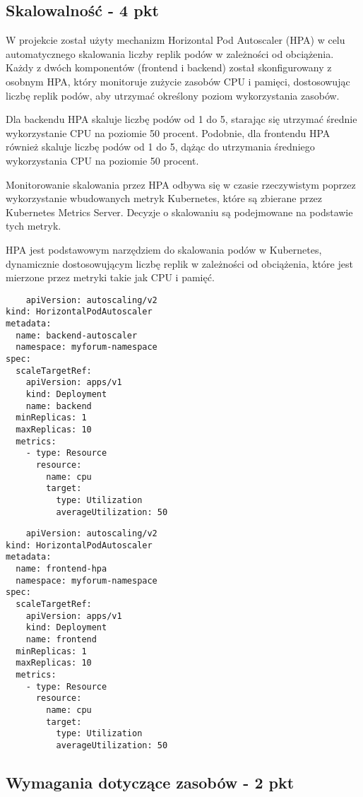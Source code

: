 \documentclass[12pt,a4paper]{article}
\begin{document}
\subsection{Skalowalność - 4 pkt}
\label{sec:ExamplesSection}

W projekcie został użyty mechanizm Horizontal Pod Autoscaler (HPA) w celu automatycznego skalowania liczby replik podów w zależności od obciążenia. Każdy z dwóch komponentów (frontend i backend) został skonfigurowany z osobnym HPA, który monitoruje zużycie zasobów CPU i pamięci, dostosowując liczbę replik podów, aby utrzymać określony poziom wykorzystania zasobów.

Dla backendu HPA skaluje liczbę podów od 1 do 5, starając się utrzymać średnie wykorzystanie CPU na poziomie 50 procent. Podobnie, dla frontendu HPA również skaluje liczbę podów od 1 do 5, dążąc do utrzymania średniego wykorzystania CPU na poziomie 50 procent.

Monitorowanie skalowania przez HPA odbywa się w czasie rzeczywistym poprzez wykorzystanie wbudowanych metryk Kubernetes, które są zbierane przez Kubernetes Metrics Server. Decyzje o skalowaniu są podejmowane na podstawie tych metryk.

HPA jest podstawowym narzędziem do skalowania podów w Kubernetes, dynamicznie dostosowującym liczbę replik w zależności od obciążenia, które jest mierzone przez metryki takie jak CPU i pamięć.

\begin{verbatim}
    apiVersion: autoscaling/v2
kind: HorizontalPodAutoscaler
metadata:
  name: backend-autoscaler
  namespace: myforum-namespace
spec:
  scaleTargetRef:
    apiVersion: apps/v1
    kind: Deployment
    name: backend
  minReplicas: 1
  maxReplicas: 10
  metrics:
    - type: Resource
      resource:
        name: cpu
        target:
          type: Utilization
          averageUtilization: 50
\end{verbatim}
\begin{verbatim}
    apiVersion: autoscaling/v2
kind: HorizontalPodAutoscaler
metadata:
  name: frontend-hpa
  namespace: myforum-namespace
spec:
  scaleTargetRef:
    apiVersion: apps/v1
    kind: Deployment
    name: frontend
  minReplicas: 1
  maxReplicas: 10
  metrics:
    - type: Resource
      resource:
        name: cpu
        target:
          type: Utilization
          averageUtilization: 50
\end{verbatim}
\subsection{Wymagania dotyczące zasobów - 2 pkt}
\label{sec:ExampleTables}
\end{document}
